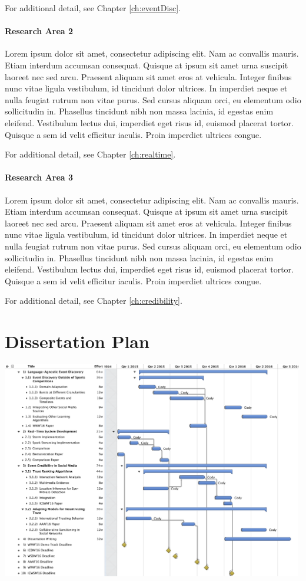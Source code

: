 \documentclass[oneside]{memoir}
\begin{document}
For additional detail, see Chapter \ref{ch:eventDisc}.

\paragraph{Research Area 2} 
Lorem ipsum dolor sit amet, consectetur adipiscing elit. Nam ac convallis mauris. Etiam interdum accumsan consequat. Quisque at ipsum sit amet urna suscipit laoreet nec sed arcu. Praesent aliquam sit amet eros at vehicula. Integer finibus nunc vitae ligula vestibulum, id tincidunt dolor ultrices. In imperdiet neque et nulla feugiat rutrum non vitae purus. Sed cursus aliquam orci, eu elementum odio sollicitudin in. Phasellus tincidunt nibh non massa lacinia, id egestas enim eleifend. Vestibulum lectus dui, imperdiet eget risus id, euismod placerat tortor. Quisque a sem id velit efficitur iaculis. Proin imperdiet ultrices congue.

For additional detail, see Chapter \ref{ch:realtime}.

\paragraph{Research Area 3} 
Lorem ipsum dolor sit amet, consectetur adipiscing elit. Nam ac convallis mauris. Etiam interdum accumsan consequat. Quisque at ipsum sit amet urna suscipit laoreet nec sed arcu. Praesent aliquam sit amet eros at vehicula. Integer finibus nunc vitae ligula vestibulum, id tincidunt dolor ultrices. In imperdiet neque et nulla feugiat rutrum non vitae purus. Sed cursus aliquam orci, eu elementum odio sollicitudin in. Phasellus tincidunt nibh non massa lacinia, id egestas enim eleifend. Vestibulum lectus dui, imperdiet eget risus id, euismod placerat tortor. Quisque a sem id velit efficitur iaculis. Proin imperdiet ultrices congue.

For additional detail, see Chapter \ref{ch:credibility}.

\section{Dissertation Plan}

\begin{center}
\label{fig:articulation}
\includegraphics[width=0.99\textwidth]{./Figures/plan}
\end{center}
\end{document}
